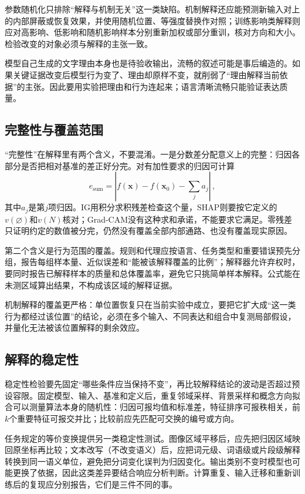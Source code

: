 参数随机化只排除“解释与机制无关”这一类缺陷。机制解释还应能预测新输入对上的内部屏蔽或恢复效果，并使用随机位置、等强度替换作对照；训练影响类解释则应对高影响、低影响和随机影响样本分别重新加权或部分重训，核对方向和大小。检验改变的对象必须与解释的主张一致。

模型自己生成的文字理由本身也是待验收输出，流畅的叙述可能是事后编造的。如果关键证据改变后模型行为变了、理由却原样不变，就削弱了“理由解释当前依据”的主张。因此要用实验把理由和行为连起来；语言清晰流畅只能验证表达质量。

\subsection{完整性与覆盖范围}
\label{sec:interpretability-quality-coverage}

“完整性”在解释里有两个含义，不要混淆。一是分数差分配意义上的完整：归因各部分是否把相对基准的差正好分完。对有加性要求的归因可计算
\[
 e_{\mathrm{sum}}
 =\left|f(\bm{x})-f(\bm{x}_0)-\sum_j a_j\right|\, ,
\]
其中$a_j$是第$j$项归因。IG用积分求积残差检查这个量，SHAP则要按它定义的$v(\varnothing)$和$v(N)$核对；Grad-CAM没有这种求和承诺，不能要求它满足。零残差只证明约定的数值被分完，仍然没有覆盖全部内部通路、也没有覆盖现实原因。

第二个含义是行为范围的覆盖。规则和代理应按语言、任务类型和重要错误预先分组，报告每组样本量、近似误差和“能被该解释覆盖的比例”；解释器允许弃权时，要同时报告已解释样本的质量和总体覆盖率，避免它只挑简单样本解释。公式能在未测区域算出结果，不构成该区域的解释证据。

机制解释的覆盖更严格：单位置恢复只在当前实验中成立，要把它扩大成“这一类行为都经过该位置”的结论，必须在多个输入、不同表达和组合中复测局部假设，并量化无法被该位置解释的剩余效应。

\subsection{解释的稳定性}
\label{sec:interpretability-quality-stability}

稳定性检验要先固定“哪些条件应当保持不变”，再比较解释结论的波动是否超过预设容限。固定模型、输入、基准和定义后，重复邻域采样、背景采样和概念方向拟合可以测量算法本身的随机性：归因可报均值和标准差，特征排序可报秩相关，前$k$个重要特征可报交并比；比较前应先匹配可交换的编号或方向。

任务规定的等价变换提供另一类稳定性测试。图像区域平移后，应先把归因区域映回原坐标再比较；文本改写（不改变语义）后，应把词元级、词语级或片段级解释转换到同一语义单位，避免把分词变化误判为归因变化。输出类别不变时模型也可能更换了依据，因此这类差异要结合响应分析判断。计算重复、输入迁移和重新训练后的复现应分别报告，它们是三件不同的事。

